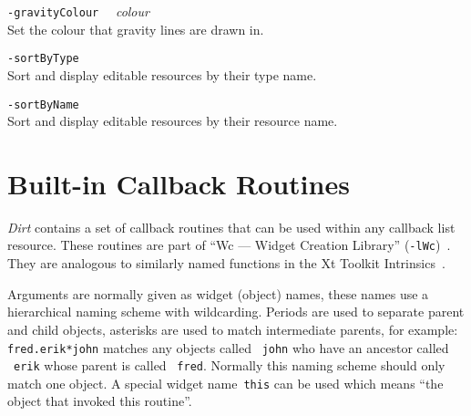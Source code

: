 \begin{description}
\item{{\tt -gravityColour} ~~\em colour} \\
Set the colour that gravity lines are drawn in.

\item{\tt -sortByType} \\
Sort and display editable resources by their type name.

\item{\tt -sortByName} \\
Sort and display editable resources by their resource name. 

\end{description}

\newpage{}
\section{Built-in Callback Routines}
\label{appendix:callbacks}
{\em Dirt} contains a set of callback routines that can be used within any
callback list resource.  These routines are part of
``Wc --- Widget Creation Library'' ({\tt -lWc})~\cite{Wcl}.  They are 
analogous to similarly named functions in the Xt Toolkit 
Intrinsics~\cite{XtIntrinsics}.

Arguments are normally given as widget (object) names, these names use a 
hierarchical naming scheme with wildcarding. Periods are used to 
separate parent and child objects, asterisks are used to match 
intermediate parents, for example: {\tt *fred.erik*john} matches any 
objects called ~{\tt john} who have an ancestor called ~{\tt erik} whose 
parent is called ~{\tt fred}. Normally this naming scheme should only 
match one object.  A special widget name~{\tt this} can be used which 
means ``the object that invoked this routine''.

